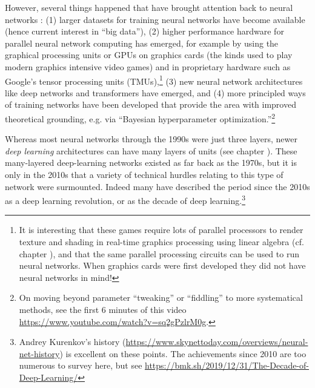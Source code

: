 However, several things happened that have brought attention back to neural networks : (1) larger datasets for training neural networks have become available (hence current interest in ``big data''), (2) higher performance hardware for parallel neural network computing has emerged, for example by using the graphical processing units or GPUs on graphics cards (the kinds used to play modern graphics intensive video games) and in proprietary hardware such as Google's tensor processing units (TMUs),\footnote{It is interesting that these games require lots of parallel processors to render texture and shading in real-time graphics processing using linear algebra (cf. chapter ), and that the same parallel processing circuits can be used to run neural networks. When graphics cards were first developed they did not have neural networks in mind!} (3) new neural network architectures like deep networks and transformers have emerged, and (4) more principled ways of training networks have been developed that provide the area with improved  theoretical grounding, e.g. via ``Bayesian hyperparameter optimization.''\footnote{On moving beyond parameter ``tweaking'' or ``fiddling'' to more systematical methods, see the first 6 minutes of this video \url{https://www.youtube.com/watch?v=sq2gPzlrM0g}.}

Whereas most neural networks through the 1990s were just three layers, newer \emph{deep learning} architectures can have many layers of units (see chapter ). These many-layered deep-learning networks existed as far back as the 1970s, but it is only in the 2010s  that a variety of technical hurdles relating to this type of network were surmounted. Indeed many have described the period since the 2010s as a deep learning revolution, or as the decade of deep learning.\footnote{Andrey Kurenkov's history (\url{https://www.skynettoday.com/overviews/neural-net-history}) is excellent on these points. The achievements since 2010 are too numerous to survey here, but see \url{https://bmk.sh/2019/12/31/The-Decade-of-Deep-Learning/}} 